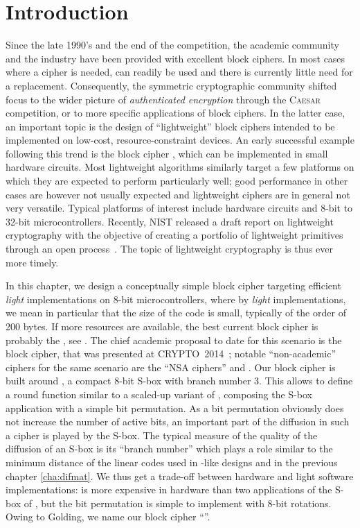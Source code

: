 \section{Introduction}
Since the late 1990's and the end of the \aes competition, the academic community and the industry have been provided with excellent block ciphers.
In most cases where a cipher is needed, \aes \cite{rijndael} can readily be used and there is currently little need for a replacement.
Consequently, the symmetric cryptographic community shifted focus to \eg the wider picture of \emph{authenticated encryption} through
the \textsc{Caesar} competition, or to more specific applications of block ciphers. In the latter case, an important topic is
the design of ``lightweight'' block ciphers intended to be implemented on low-cost, resource-constraint devices. An early
successful example following this trend is the block cipher \present \cite{present}, which can be implemented in small hardware circuits.
Most lightweight algorithms similarly target a few platforms on which they are expected to perform particularly well;
good performance in other cases are however not usually expected and lightweight ciphers are in general not very versatile.
Typical platforms of interest include hardware circuits and 8-bit to 32-bit microcontrollers.
Recently, NIST released a draft report on lightweight cryptography with the objective of creating a portfolio of lightweight primitives
through an open process~\cite{NistLightDraft}. The topic of lightweight cryptography is thus ever more timely. 

In this chapter, we design a conceptually simple block cipher targeting efficient \emph{light} implementations on 8-bit microcontrollers, where
by \emph{light} implementations,
we mean in particular that the size of the code is small, typically of the order of 200 bytes. If more resources are available, the best current block cipher is
probably the \aes, see \eg \cite{DBLP:journals/iacr/BeaulieuSSTWW15}.
The chief academic proposal to date for this scenario is the \pride block cipher,
that was presented at CRYPTO~2014~\cite{pride};
notable
``non-academic'' ciphers for the same scenario are the ``NSA ciphers'' \simon and \speck \cite{NSAciph}.
Our block cipher is built around \littlunOne, a compact 8-bit S-box with branch number 3. This allows
to define a round function similar to a scaled-up variant of \present, composing the S-box application with a simple bit permutation. As a bit permutation
obviously does not increase the number of active bits, an important part of the diffusion in such a cipher is played by the S-box. The typical measure of the quality
of the diffusion of an S-box is its ``branch number'' which plays a role similar to the minimum distance of the linear codes used in \aes-like designs
and in the previous chapter \autoref{cha:difmat}.
We thus get a trade-off between hardware and light software implementations: \littlunOne is more expensive in hardware than two applications
of the S-box of \present, but the bit permutation is simple to implement with 8-bit rotations. Owing to Golding, we name our
block cipher ``\fly''.

